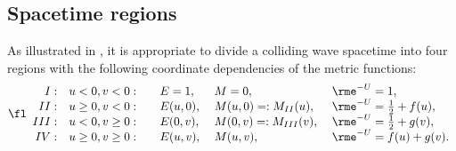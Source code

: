 \documentclass[12pt]{iopart}
\begin{document}





\subsection{Spacetime regions}

As illustrated in , it is appropriate to divide a colliding wave spacetime into four regions \cite{Khan_Penrose1971} with the following coordinate dependencies of the metric functions: 
\begin{eqnarray} \fl\begin{array}{rllll}
I: & u<0,v<0: \quad & E=1,      & M=0,           & \rme^{-U}=1, \\
II: & u\geq 0,v<0: & E(u,0), \;& M(u,0)=:M_{II}(u),  & \rme^{-U}=\frac12+f(u), \\
III: & u<0,v\geq 0: & E(0,v), & M(0,v)=:M_{III}(v),\;& \rme^{-U}=\frac12+g(v), \\
IV: & u\geq 0,v\geq 0: & E(u,v), & M(u,v),       & \rme^{-U}=f(u)+g(v). \\
\end{array}\end{eqnarray}
\end{document}
